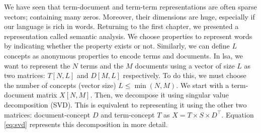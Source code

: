 \documentclass{KBook}
\begin{document}
We have seen that term-document and term-term representations are often sparse vectors; containing many zeros. 
Moreover, their dimensions are huge, especially if our language is rich in words. 
Returning to the first chapter, we presented a representation called semantic analysis. 
We choose properties to represent words by indicating whether the property exists or not. 
Similarly, we can define $L$ concepts as anonymous properties to encode terms and documents. 
In \ac{lsa}, we want to represent the $N$ terms and the $M$ documents using a vector of size $L$ as two matrices: $T[N, L]$ and $D[M, L]$ respectively.
To do this, we must choose the number of concepts (vector size) $L \le \min(N, M)$. 
We start with a term-document matrix $X[N, M]$. 
Then, we decompose it using singular value decomposition (SVD). 
This is equivalent to representing it using the other two matrices: document-concept $D$ and term-concept $T$ as
$X = T \times S \times D^\top$. 
Equation \ref{eq:svd} represents this decomposition in more detail. 
\end{document}
